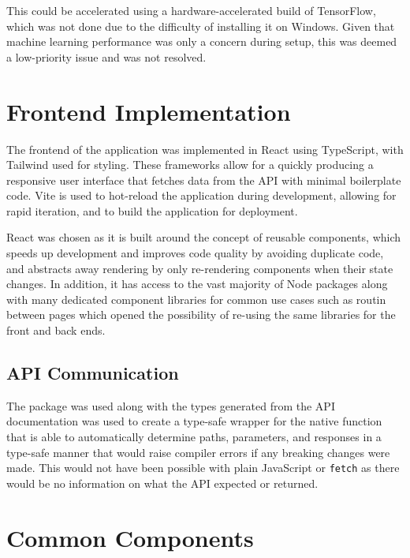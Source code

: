 This could be accelerated using a hardware-accelerated build of TensorFlow, which was not done due to the difficulty of installing
it on Windows. Given that machine learning performance was only a concern during setup, this was deemed a low-priority
issue and was not resolved.

\section{Frontend Implementation}

The frontend of the application was implemented in React using TypeScript, with Tailwind used for styling. These
frameworks allow for a quickly producing a responsive user interface that fetches data from the API with minimal
boilerplate code. Vite is used to hot-reload the application during development, allowing for rapid iteration, and
to build the application for deployment.

React was chosen as it is built around the concept of reusable components, which speeds up development and
improves code quality by avoiding duplicate code,~\cite{hordijk_harmfulness_2009} and abstracts away rendering
by only re-rendering components when their state changes. In addition, it has access to the vast majority of
Node packages along with many dedicated component libraries for common use cases such as routin between pages
which opened the possibility of re-using the same libraries for the front and back ends.~\cite{saks_javascript_2019}

\subsection{API Communication}
The  package was used along with the types generated from the API documentation was
used to create a type-safe wrapper for the native  function that is able to automatically
determine paths, parameters, and responses in a type-safe manner that would raise compiler errors if any breaking
changes were made. This would not have been possible with plain JavaScript or \texttt{fetch} as there would be no
information on what the API expected or returned.

\section{Common Components}

